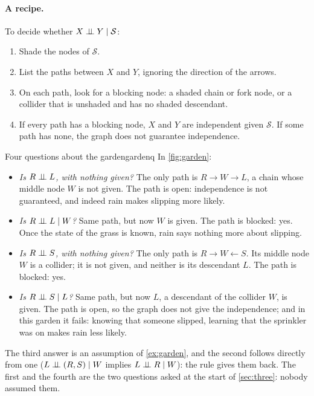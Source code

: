 \paragraph{A recipe.} To decide whether $X\mathrel{\perp\!\!\!\perp} Y\mid\mathcal S$:
\begin{enumerate}[nosep]
  \item Shade the nodes of $\mathcal S$.
  \item List the paths between $X$ and $Y$, ignoring the direction of the
    arrows.
  \item On each path, look for a blocking node: a shaded chain or fork
    node, or a collider that is unshaded and has no shaded descendant.
  \item If every path has a blocking node, $X$ and $Y$ are independent
    given $\mathcal S$. If some path has none, the graph does not
    guarantee independence.
\end{enumerate}

\begin{example}{Four questions about the garden}{gardenq}
In \cref{fig:garden}:
\begin{itemize}[nosep]
  \item \emph{Is $R\mathrel{\perp\!\!\!\perp} L$, with nothing given?} The only path is
    $R\rightarrow W\rightarrow L$, a chain whose middle node $W$ is not
    given. The path is open: independence is not guaranteed, and indeed
    rain makes slipping more likely.
  \item \emph{Is $R\mathrel{\perp\!\!\!\perp} L\mid W$?} Same path, but now $W$ is given. The
    path is blocked: yes. Once the state of the grass is known, rain says
    nothing more about slipping.
  \item \emph{Is $R\mathrel{\perp\!\!\!\perp} S$, with nothing given?} The only path is
    $R\rightarrow W\leftarrow S$. Its middle node $W$ is a collider; it is
    not given, and neither is its descendant $L$. The path is blocked:
    yes.
  \item \emph{Is $R\mathrel{\perp\!\!\!\perp} S\mid L$?} Same path, but now $L$, a descendant
    of the collider $W$, is given. The path is open, so the graph does not
    give the independence; and in this garden it fails: knowing that
    someone slipped, learning that the sprinkler was on makes rain less
    likely.
\end{itemize}
The third answer is an assumption of \cref{ex:garden}, and the second
follows directly from one ($L\mathrel{\perp\!\!\!\perp}(R,S)\mid W$ implies $L\mathrel{\perp\!\!\!\perp} R\mid W$):
the rule gives them back. The first and the fourth are the two questions
asked at the start of \cref{sec:three}: nobody assumed them.
\end{example}

